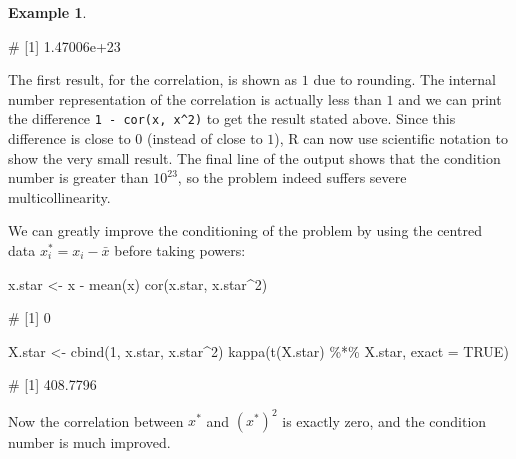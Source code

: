 \documentclass[
  a4paper,
]{article}
\newenvironment{Shaded}{\begin{snugshade}}{\end{snugshade}}
\newcommand{\AttributeTok}[1]{\textcolor[rgb]{0.77,0.63,0.00}{#1}}
\newcommand{\ConstantTok}[1]{\textcolor[rgb]{0.00,0.00,0.00}{#1}}
\newcommand{\DecValTok}[1]{\textcolor[rgb]{0.00,0.00,0.81}{#1}}
\newcommand{\FunctionTok}[1]{\textcolor[rgb]{0.00,0.00,0.00}{#1}}
\newcommand{\NormalTok}[1]{#1}
\newcommand{\OtherTok}[1]{\textcolor[rgb]{0.56,0.35,0.01}{#1}}
\newcommand{\SpecialCharTok}[1]{\textcolor[rgb]{0.00,0.00,0.00}{#1}}
\theoremstyle{definition}
\theoremstyle{definition}
\newtheorem{example}{Example}[section]
\theoremstyle{definition}
\theoremstyle{definition}
\theoremstyle{remark}
\begin{document}
\begin{example}
\begin{Shaded}
\begin{Highlighting}[]
\NormalTok{\# [1] 1.47006e+23}
\end{Highlighting}
\end{Shaded}

The first result, for the correlation, is shown as \(1\) due to rounding.
The internal number representation of the correlation is actually less than
\(1\) and we can print the difference \texttt{1\ -\ cor(x,\ x\^{}2)} to get the result
stated above. Since this difference is close to \(0\) (instead of close to \(1\)),
R can now use scientific notation to show the very small result. The final line
of the output shows that the condition number is greater than \(10^{23}\),
so the problem indeed suffers severe multicollinearity.

We can greatly improve the conditioning of the problem
by using the centred data \(x^\ast_i = x_i - \bar x\) before taking powers:

\begin{Shaded}
\begin{Highlighting}[]
\NormalTok{x.star }\OtherTok{\textless{}{-}}\NormalTok{ x }\SpecialCharTok{{-}} \FunctionTok{mean}\NormalTok{(x)}
\FunctionTok{cor}\NormalTok{(x.star, x.star}\SpecialCharTok{\^{}}\DecValTok{2}\NormalTok{)}
\end{Highlighting}
\end{Shaded}

\begin{Shaded}
\begin{Highlighting}[]
\NormalTok{\# [1] 0}
\end{Highlighting}
\end{Shaded}

\begin{Shaded}
\begin{Highlighting}[]
\NormalTok{X.star }\OtherTok{\textless{}{-}} \FunctionTok{cbind}\NormalTok{(}\DecValTok{1}\NormalTok{, x.star, x.star}\SpecialCharTok{\^{}}\DecValTok{2}\NormalTok{)}
\FunctionTok{kappa}\NormalTok{(}\FunctionTok{t}\NormalTok{(X.star) }\SpecialCharTok{\%*\%}\NormalTok{ X.star, }\AttributeTok{exact =} \ConstantTok{TRUE}\NormalTok{)}
\end{Highlighting}
\end{Shaded}

\begin{Shaded}
\begin{Highlighting}[]
\NormalTok{\# [1] 408.7796}
\end{Highlighting}
\end{Shaded}

Now the correlation between \(x^\ast\) and \((x^\ast)^2\) is exactly zero,
and the condition number is much improved.
\end{example}
\end{document}
